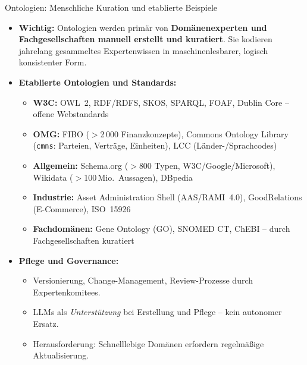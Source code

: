 \documentclass[aspectratio=1610, xcolor=dvipsnames, 9pt]{beamer}
\begin{document}
\begin{frame}{Ontologien: Menschliche Kuration und etablierte Beispiele}
  \begin{itemize}
    \item \textbf{Wichtig:} Ontologien werden primär von \textbf{Domänenexperten und Fachgesellschaften manuell erstellt und kuratiert}. Sie kodieren jahrelang gesammeltes Expertenwissen in maschinenlesbarer, logisch konsistenter Form.
    \item \textbf{Etablierte Ontologien und Standards:}
      \begin{itemize}
        \item \textbf{W3C:} OWL~2, RDF/RDFS, SKOS, SPARQL, FOAF, Dublin Core -- offene Webstandards
        \item \textbf{OMG:} FIBO ($>$2\,000 Finanzkonzepte), Commons Ontology Library (\texttt{cmns}: Parteien, Verträge, Einheiten), LCC (Länder-/Sprachcodes)
        \item \textbf{Allgemein:} Schema.org ($>$800 Typen, W3C/Google/Microsoft), Wikidata ($>$100\,Mio.\ Aussagen), DBpedia
        \item \textbf{Industrie:} Asset Administration Shell (AAS/RAMI~4.0), GoodRelations (E-Commerce), ISO~15926
        \item \textbf{Fachdomänen:} Gene Ontology (GO), SNOMED CT, ChEBI -- durch Fachgesellschaften kuratiert
      \end{itemize}
    \item \textbf{Pflege und Governance:}
      \begin{itemize}
        \item Versionierung, Change-Management, Review-Prozesse durch Expertenkomitees.
        \item LLMs als \emph{Unterstützung} bei Erstellung und Pflege -- kein autonomer Ersatz.
        \item Herausforderung: Schnelllebige Domänen erfordern regelmäßige Aktualisierung.
      \end{itemize}
  \end{itemize}
\end{frame}
\end{document}
